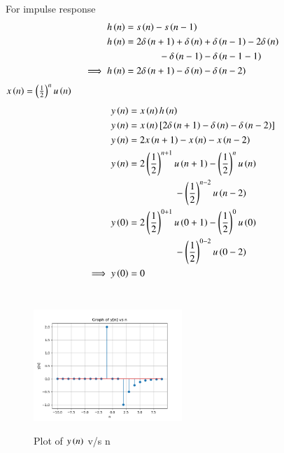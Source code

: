 \documentclass[journal,12pt,twocolumn]{IEEEtran}
\theoremstyle{remark}
\begin{document}
\noindent For impulse response
\begin{align}
h\left(n\right)&=s\left(n\right)-s\left(n-1\right)\\
\notag h\left(n\right) &=2\delta\left(n+1\right)+\delta\left(n\right)+\delta\left(n-1\right)-2\delta\left(n\right) \\
&~~~~~~~~~~~~~~-\delta\left(n-1\right)-\delta\left(n-1-1\right)\\
\implies h\left(n\right) &=2\delta\left(n+1\right)-\delta\left(n\right)-\delta\left(n-2\right)
\end{align}
$x\left(n\right)=\left(\frac{1}{2}\right)^nu\left(n\right)$
\begin{align}
y\left(n\right) &= x\left(n\right)h\left(n\right)\\
y\left(n\right) &= x\left(n\right)[2\delta\left(n+1\right)-\delta\left(n\right)-\delta\left(n-2\right)]\\
y\left(n\right) &= 2x\left(n+1\right)-x\left(n\right)-x\left(n-2\right)\\
\notag y\left(n\right) &=2\left(\frac{1}{2}\right)^{n+1}u\left(n+1\right)-\left(\frac{1}{2}\right)^nu\left(n\right)\\
&~~~~~~~~~~~~~~~~~~~-\left(\frac{1}{2}\right)^{n-2}u\left(n-2\right)\\
\notag y\left(0\right) &=2\left(\frac{1}{2}\right)^{0+1}u\left(0+1\right)-\left(\frac{1}{2}\right)^0u\left(0\right)\\
&~~~~~~~~~~~~~~~~~~~-\left(\frac{1}{2}\right)^{0-2}u\left(0-2\right)\\
\implies y\left(0\right) &=0
\end{align}\\
\pagebreak
\begin{figure}[h]
    \includegraphics[width=0.5\textwidth]{figs/y(n) vs n.png}\label{fig:stem plot}
    \caption{Plot of $y\left(n\right)$ v/s n}
\end{figure}
\end{document}

